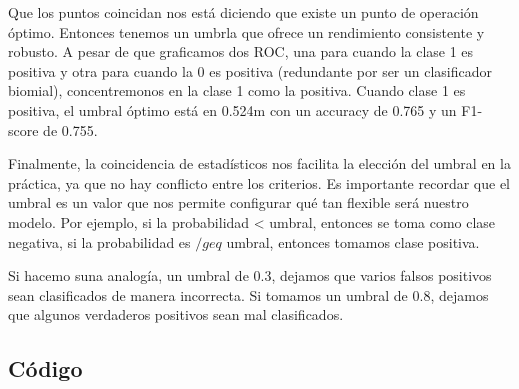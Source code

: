         Que los puntos coincidan nos está diciendo que existe un punto de operación óptimo. Entonces tenemos
        un umbrla que ofrece un rendimiento consistente y robusto. A pesar de que graficamos dos ROC, una para
        cuando la clase 1 es positiva y otra para cuando la 0 es positiva (redundante por ser un clasificador
        biomial), concentremonos en la clase 1 como la positiva. Cuando clase 1 es positiva, el umbral óptimo está en 0.524m con un accuracy de 0.765 y un F1-score de 
        0.755. 

        Finalmente, la coincidencia de estadísticos nos facilita la elección del umbral en la práctica, ya
        que no hay conflicto entre los criterios. Es importante recordar que el umbral es un valor que nos 
        permite configurar qué tan flexible será nuestro modelo. Por ejemplo, si la probabilidad < umbral, entonces
        se toma como clase negativa, si la probabilidad es $/geq$ umbral, entonces tomamos clase positiva.
        
        Si hacemo suna analogía, un umbral de 0.3, dejamos que varios falsos positivos sean clasificados de manera
        incorrecta. Si tomamos un umbral de 0.8, dejamos que algunos verdaderos positivos sean mal clasificados. 
        


\subsection{Código}

